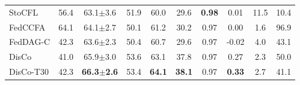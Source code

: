 {\begin{tabular}{lccccccccc}
StoCFL & 56.4 & 63.1$\pm$3.6 & 51.9 & 60.0 & 29.6 & \textbf{0.98} & 0.01 & 11.5 & 10.4 \\
FedCCFA & 64.1 & 64.1$\pm$2.7 & 50.1 & 61.2 & 30.2 & 0.97 & 0.00 & 1.6 & 96.9 \\
FedDAG-C & 42.3 & 63.6$\pm$2.3 & 50.4 & 60.7 & 29.6 & 0.97 & -0.02 & 4.0 & 43.1 \\
DisCo & 41.0 & 65.9$\pm$3.0 & 53.6 & 63.1 & 37.8 & 0.97 & 0.27 & 2.3 & 50.0 \\
DisCo-T30 & 42.3 & \textbf{66.3$\pm$2.6} & 53.4 & \textbf{64.1} & \textbf{38.1} & 0.97 & \textbf{0.33} & 2.7 & 41.1 \\
\bottomrule
\end{tabular}}
